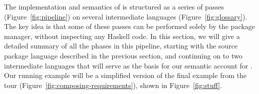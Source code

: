 
The implementation and semantics of \Backpack{} is structured as a
series of passes (Figure~\ref{fig:pipeline}) on several intermediate
languages (Figure~\ref{fig:glossary}).  The key idea is that some of
these passes can be performed solely by the package manager, without
inspecting any Haskell code.  In this section, we will give a detailed
summary of all the phases in this pipeline, starting with the source
package language described in the previous section, and continuing on to
two intermediate languages that will serve as the basis for our
semantic account for \Backpack{}.  Our running example will be a
simplified version of the final example from the tour (Figure~\ref{fig:composing-requirements}), shown in Figure~\ref{fig:stuff}.




